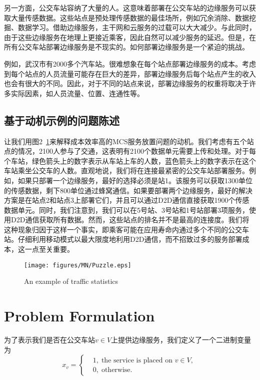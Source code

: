 另一方面，公交车站容纳了大量的人。这意味着部署在公交车站的边缘服务可以获取大量传感数据。这些站点是预处理传感数据的最佳场所，例如冗余消除、数据挖掘、数据学习。借助边缘服务，主干网和云服务的过载可以大大减少。与此同时，由于这些边缘服务在地理上更接近乘客，因此自然可以减少服务的延迟。但是，在所有公交车站部署边缘服务是不现实的。如何部署边缘服务是一个紧迫的挑战。


例如，武汉市有2000多个汽车站。很难想象在每个站点部署边缘服务的成本。考虑到每个站点的人员流量可能存在巨大的差异，部署边缘服务后每个站点产生的收入也会有很大的不同。因此，对于不同的站点来说，部署边缘服务的权重将取决于许多实际因素，如人员流量、位置、连通性等。

\subsection{基于动机示例的问题陈述}

让我们用图2~\ref{Figure_puzzle}来解释成本效率高的MCS服务放置问题的动机。我们考虑有五个站点的情况，2100人参与了交通，这表明有2100个数据单元需要上传和处理。对于每个车站，绿色箭头上的数字表示从车站上车的人数，蓝色箭头上的数字表示在这个车站乘坐公交车的人数。直观地说，我们将在连接最紧密的公交车站部署服务。例如，如果只部署一个边缘服务，最好的选择必须是站1。该服务可以获取1300单位的传感数据，剩下800单位通过蜂窝通信。如果要部署两个边缘服务，最好的解决方案是在站点2和站点3上部署它们，并且可以通过D2D通信直接获取1900个传感数据单元。同时，我们注意到，我们可以在5号站、3号站和1号站部署3项服务，使用D2D通信获取所有数据。然而，这些站点的排名并不是最高的连接度。我们将这种现象归因于这样一个事实，即乘客可能在应用寿命内通过多个不同的公交车站。仔细利用移动模式以最大限度地利用D2D通信，而不招致过多的服务部署成本，这一点至关重要。

\begin{figure}[!h]
\centering
\texttt{[image: figures/MN/Puzzle.eps]}
\caption{An example of traffic statistics}
\label{Figure_puzzle}
\end{figure}

\section{Problem Formulation}

为了表示我们是否在公交车站$v\in V$上提供边缘服务，我们定义了一个二进制变量为
\[
x_v =\left\{
\begin{aligned}
&1, \; \text{the service is placed on $v\in V$, }\\
&0, \; \text{otherwise}.
\end{aligned}
\right.
\]

